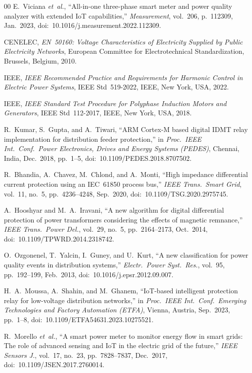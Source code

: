 \documentclass[conference]{IEEEtran}
\begin{document}
\begin{thebibliography}{00}
E.~Viciana \textit{et~al.},
``All-in-one three-phase smart meter and power quality analyzer with
extended IoT capabilities,''
\textit{Measurement}, vol.~206, p.~112309, Jan.\ 2023,
doi:~10.1016/j.measurement.2022.112309.

CENELEC,
\textit{EN~50160: Voltage Characteristics of Electricity Supplied by
Public Electricity Networks},
European Committee for Electrotechnical Standardization, Brussels,
Belgium, 2010.

IEEE,
\textit{IEEE Recommended Practice and Requirements for Harmonic Control
in Electric Power Systems},
IEEE Std~519-2022, IEEE, New York, USA, 2022.

IEEE,
\textit{IEEE Standard Test Procedure for Polyphase Induction Motors
and Generators},
IEEE Std~112-2017, IEEE, New York, USA, 2018.

R.~Kumar, S.~Gupta, and A.~Tiwari,
``ARM Cortex-M based digital IDMT relay implementation for
distribution feeder protection,''
in \textit{Proc.\ IEEE Int.\ Conf.\ Power Electronics, Drives and
Energy Systems (PEDES)}, Chennai, India, Dec.\ 2018, pp.~1--5,
doi:~10.1109/PEDES.2018.8707502.

R.~Bhandia, A.~Chavez, M.~Chlond, and A.~Monti,
``High impedance differential current protection using an IEC~61850
process bus,''
\textit{IEEE Trans.\ Smart Grid}, vol.~11, no.~5, pp.~4236--4248,
Sep.\ 2020, doi:~10.1109/TSG.2020.2975745.

A.~Hooshyar and M.~A.~Iravani,
``A new algorithm for digital differential protection of power
transformers considering the effects of magnetic remnance,''
\textit{IEEE Trans.\ Power Del.}, vol.~29, no.~5, pp.~2164--2173,
Oct.\ 2014, doi:~10.1109/TPWRD.2014.2318742.

O.~Ozgonenel, T.~Yalcin, I.~Guney, and U.~Kurt,
``A new classification for power quality events in distribution
systems,''
\textit{Electr.\ Power Syst.\ Res.}, vol.~95, pp.~192--199,
Feb.\ 2013, doi:~10.1016/j.epsr.2012.09.007.

H.~A.~Moussa, A.~Shahin, and M.~Ghanem,
``IoT-based intelligent protection relay for low-voltage distribution
networks,''
in \textit{Proc.\ IEEE Int.\ Conf.\ Emerging Technologies and Factory
Automation (ETFA)}, Vienna, Austria, Sep.\ 2023, pp.~1--8,
doi:~10.1109/ETFA54631.2023.10275521.

R.~Morello \textit{et~al.},
``A smart power meter to monitor energy flow in smart grids: The role
of advanced sensing and IoT in the electric grid of the future,''
\textit{IEEE Sensors J.}, vol.~17, no.~23, pp.~7828--7837,
Dec.~2017, doi:~10.1109/JSEN.2017.2760014.


\end{thebibliography}
\end{document}
